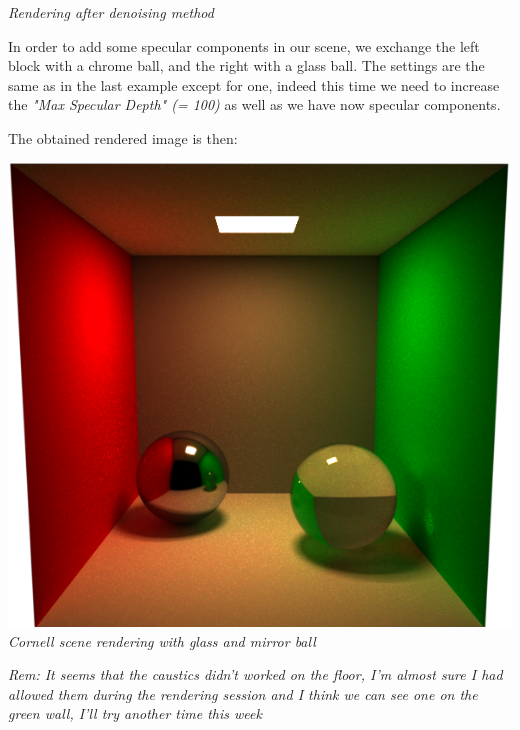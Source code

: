 \documentclass[a4,12pt]{article}
\begin{document}
\begin{center}
\begin{minipage}[b]{0.4\linewidth}
\begin{center}
				\textit{Rendering after denoising method}\\
			\end{center}
		\end{minipage}
	\end{center}
	
	In order to add some specular components in our scene, we exchange the left block with a chrome ball, and the right with a glass ball. The settings are the same as in the last example except for one, indeed this time we need to increase the \textit{"Max Specular Depth" (= 100)} as well as we have now specular components.
	
	The obtained rendered image is then:
	\begin{center}
		\begin{minipage}[b]{0.4\linewidth}
			\begin{center}
				\includegraphics[width = \textwidth]{./Worksheet9/cornellBallsC.png}\\
				\textit{Cornell scene rendering with glass and mirror ball}\\
			\end{center}
		\end{minipage}
	\end{center}
	\textit{Rem: It seems that the caustics didn't worked on the floor, I'm almost sure I had allowed them during the rendering session and I think we can see one on the green wall, I'll try another time this week}
	
	
\end{document}
